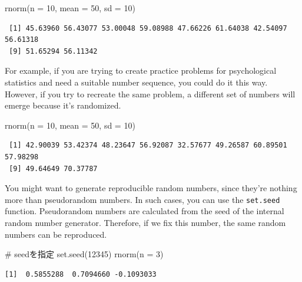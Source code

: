 \documentclass[
  a4paper,
]{book}
\newenvironment{Shaded}{\begin{snugshade}}{\end{snugshade}}
\newcommand{\AttributeTok}[1]{\textcolor[rgb]{0.40,0.45,0.13}{#1}}
\newcommand{\CommentTok}[1]{\textcolor[rgb]{0.37,0.37,0.37}{#1}}
\newcommand{\DecValTok}[1]{\textcolor[rgb]{0.68,0.00,0.00}{#1}}
\newcommand{\FunctionTok}[1]{\textcolor[rgb]{0.28,0.35,0.67}{#1}}
\newcommand{\NormalTok}[1]{\textcolor[rgb]{0.00,0.23,0.31}{#1}}
\begin{document}
\begin{Shaded}
\begin{Highlighting}[]
\FunctionTok{rnorm}\NormalTok{(}\AttributeTok{n =} \DecValTok{10}\NormalTok{, }\AttributeTok{mean =} \DecValTok{50}\NormalTok{, }\AttributeTok{sd =} \DecValTok{10}\NormalTok{)}
\end{Highlighting}
\end{Shaded}

\begin{verbatim}
 [1] 45.63960 56.43077 53.00048 59.08988 47.66226 61.64038 42.54097 56.61318
 [9] 51.65294 56.11342
\end{verbatim}

For example, if you are trying to create practice problems for
psychological statistics and need a suitable number sequence, you could
do it this way. However, if you try to recreate the same problem, a
different set of numbers will emerge because it's randomized.

\begin{Shaded}
\begin{Highlighting}[]
\FunctionTok{rnorm}\NormalTok{(}\AttributeTok{n =} \DecValTok{10}\NormalTok{, }\AttributeTok{mean =} \DecValTok{50}\NormalTok{, }\AttributeTok{sd =} \DecValTok{10}\NormalTok{)}
\end{Highlighting}
\end{Shaded}

\begin{verbatim}
 [1] 42.90039 53.42374 48.23647 56.92087 32.57677 49.26587 60.89501 57.98298
 [9] 49.64649 70.37787
\end{verbatim}

You might want to generate reproducible random numbers, since they're
nothing more than pseudorandom numbers. In such cases, you can use the
\texttt{set.seed} function. Pseudorandom numbers are calculated from the
seed of the internal random number generator. Therefore, if we fix this
number, the same random numbers can be reproduced.

\begin{Shaded}
\begin{Highlighting}[]
\CommentTok{\# seedを指定}
\FunctionTok{set.seed}\NormalTok{(}\DecValTok{12345}\NormalTok{)}
\FunctionTok{rnorm}\NormalTok{(}\AttributeTok{n =} \DecValTok{3}\NormalTok{)}
\end{Highlighting}
\end{Shaded}

\begin{verbatim}
[1]  0.5855288  0.7094660 -0.1093033
\end{verbatim}
\end{document}
